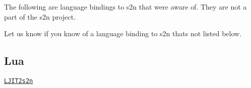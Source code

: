 The following are language bindings to s2n that we\textquotesingle{}re aware of. They are not a part of the s2n project.

Let us know if you know of a language binding to s2n that\textquotesingle{}s not listed below.

\subsection*{Lua}


\begin{DoxyItemize}
\item \href{https://github.com/wiladams/LJIT2s2n}{\tt L\+J\+I\+T2s2n} 
\end{DoxyItemize}